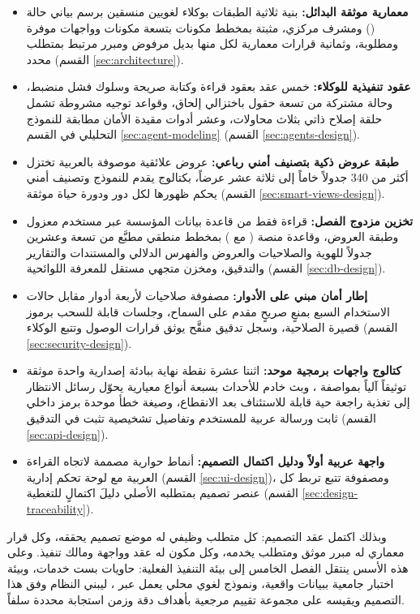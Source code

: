 \begin{itemize}[label=\textcolor{kauprimary}{$\blacktriangleright$},leftmargin=*]
  \item \textbf{معمارية موثقة البدائل:} بنية ثلاثية الطبقات بوكلاء لغويين منسقين برسم بياني حالة () ومشرف مركزي، مثبتة بمخطط مكونات  بتسعة مكونات وواجهات موفرة ومطلوبة، وثمانية قرارات معمارية لكل منها بديل مرفوض ومبرر مرتبط بمتطلب محدد (القسم \ref{sec:architecture}).
  \item \textbf{عقود تنفيذية للوكلاء:} خمس عقد بعقود قراءة وكتابة صريحة وسلوك فشل منضبط، وحالة مشتركة من تسعة حقول باختزالي إلحاق، وقواعد توجيه مشروطة تشمل حلقة إصلاح ذاتي بثلاث محاولات، وعشر أدوات مقيدة الأمان مطابقة للنموذج التحليلي في القسم \ref{sec:agent-modeling} (القسم \ref{sec:agents-design}).
  \item \textbf{طبقة عروض ذكية بتصنيف أمني رباعي:} عروض علائقية موصوفة بالعربية تختزل أكثر من 340 جدولاً خاماً إلى ثلاثة عشر عرضاً، بكتالوج يقدم للنموذج وتصنيف أمني يحكم ظهورها لكل دور ودورة حياة موثقة (القسم \ref{sec:smart-views-design}).
  \item \textbf{تخزين مزدوج الفصل:} قراءة فقط من قاعدة بيانات المؤسسة عبر مستخدم معزول وطبقة العروض، وقاعدة منصة ( مع ) بمخطط منطقي مطبَّع من تسعة وعشرين جدولاً للهوية والصلاحيات والعروض والفهرس الدلالي والمستندات والتقارير والتدقيق، ومخزن متجهي مستقل للمعرفة اللوائحية (القسم \ref{sec:db-design}).
  \item \textbf{إطار أمان مبني على الأدوار:} مصفوفة صلاحيات لأربعة أدوار مقابل حالات الاستخدام السبع بمنعٍ صريحٍ مقدم على السماح، وجلسات قابلة للسحب برموز قصيرة الصلاحية، وسجل تدقيق منقَّح يوثق قرارات الوصول وتتبع الوكلاء (القسم \ref{sec:security-design}).
  \item \textbf{كتالوج واجهات برمجية موحد:} اثنتا عشرة نقطة نهاية ببادئة إصدارية واحدة موثقة توثيقاً آلياً بمواصفة ، وبث خادم للأحداث  بسبعة أنواع معيارية يحوّل رسائل الانتظار إلى تغذية راجعة حية قابلة للاستئناف بعد الانقطاع، وصيغة خطأ موحدة برمز داخلي ثابت ورسالة عربية للمستخدم وتفاصيل تشخيصية تثبت في التدقيق (القسم \ref{sec:api-design}).
  \item \textbf{واجهة عربية أولاً ودليل اكتمال التصميم:} أنماط حوارية مصممة لاتجاه القراءة العربية مع لوحة تحكم إدارية (القسم \ref{sec:ui-design})، ومصفوفة تتبع تربط كل عنصر تصميم بمتطلبه الأصلي دليلَ اكتمالٍ للتغطية (القسم \ref{sec:design-traceability}).
\end{itemize}

وبذلك اكتمل عقد التصميم: كل متطلب وظيفي له موضع تصميم يحققه، وكل قرار معماري له مبرر موثق ومتطلب يخدمه، وكل مكون له عقد وواجهة ومالك تنفيذ. وعلى هذه الأسس ينتقل الفصل الخامس إلى بيئة التنفيذ الفعلية: حاويات  بست خدمات، وبيئة اختبار  جامعية ببيانات واقعية، ونموذج لغوي محلي يعمل عبر ، ليبني النظام وفق هذا التصميم ويقيسه على مجموعة تقييم مرجعية بأهداف دقة وزمن استجابة محددة سلفاً.
